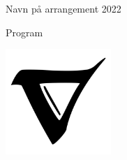 \documentclass{article}
\begin{document}
\begin{landscape}
\begin{multicols}{3}
\begin{center}
\columnbreak

\null

\bigskip
\bigskip
\bigskip
\Large
Navn på arrangement 2022 %

\bigskip
\large
Program


\bigskip
\bigskip
\bigskip
\begin{center}
\includegraphics[width=0.3\textwidth]{bilder/nabla.jpg}
\end{center}
\end{center}


\end{multicols}
\end{landscape}
\end{document}

